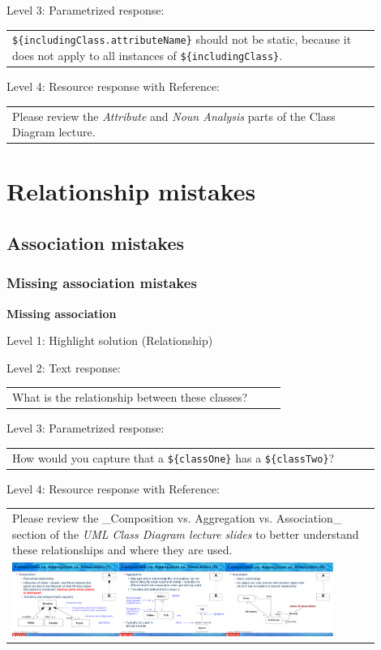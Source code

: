\noindent Level 3: Parametrized response: \medskip

\begin{tabular}{|p{0.9\linewidth}}
\verb|${includingClass.attributeName}| should not be static, because it does not apply to all instances of \verb|${includingClass}|.
\end{tabular} \medskip

\noindent Level 4: Resource response with Reference: \medskip

\begin{tabular}{|p{0.9\linewidth}}
Please review the \textit{Attribute} and \textit{Noun Analysis} parts of the Class Diagram lecture.
\end{tabular} \medskip



\section{Relationship mistakes}

\subsection{Association mistakes}

\subsubsection{Missing association mistakes}

\noindent \textbf{Missing association} \medskip

\noindent Level 1: Highlight solution (Relationship) \medskip

\noindent Level 2: Text response: \medskip

\begin{tabular}{|p{0.9\linewidth}}
What is the relationship between these classes?
\end{tabular} \medskip

\noindent Level 3: Parametrized response: \medskip

\begin{tabular}{|p{0.9\linewidth}}
How would you capture that a \verb|${classOne}| has a \verb|${classTwo}|?
\end{tabular} \medskip

\noindent Level 4: Resource response with Reference: \medskip

\begin{tabular}{|p{0.9\linewidth}}
Please review the _Composition vs. Aggregation vs. Association_ section of 
the \textit{UML Class Diagram lecture slides} to 
better understand these relationships and where they are used.

\\
\includegraphics[width=0.9\textwidth]{images/composition_aggregation_association.png}
\end{tabular} \medskip


